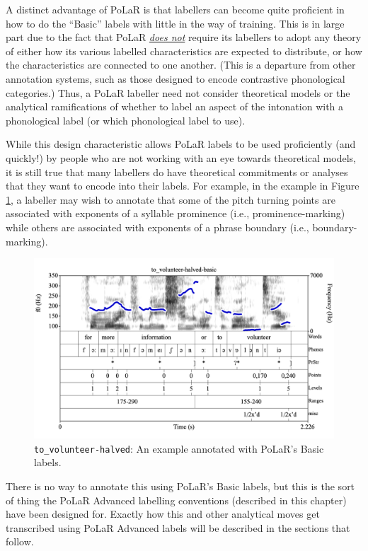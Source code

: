 \documentclass[11pt, twoside]{memoir}
\begin{document}
A distinct advantage of PoLaR is that labellers can become quite proficient in how to do the “Basic” labels with little in the way of training. This is in large part due to the fact that PoLaR \textit{\uline{does not}} require its labellers to adopt any theory of either how its various labelled characteristics are expected to distribute, or how the characteristics are connected to one another. (This is a departure from other annotation systems, such as those designed to encode contrastive phonological categories.) Thus, a PoLaR labeller need not consider theoretical models or the analytical ramifications of whether to label an aspect of the intonation with a phonological label (or which phonological label to use).

While this design characteristic allows PoLaR labels to be used proficiently (and quickly!) by people who are not working with an eye towards theoretical models, it is still true that many labellers do have theoretical commitments or analyses that they want to encode into their labels. For example, in the example in Figure \ref{fig:to volunteer-halved all basics}, a labeller may wish to annotate that some of the pitch turning points are associated with exponents of a syllable prominence (i.e., prominence-marking) while others are associated with exponents of a phrase boundary (i.e., boundary-marking).

\begin{figure}[H]
\centering
%
\includegraphics[width=.875\linewidth]{Appendix-to_volunteer-halved.png}
%
\caption{\texttt{to\_volunteer-halved}: An example annotated with PoLaR’s Basic labels.%
\label{fig:to volunteer-halved all basics}%
}
\end{figure}

There is no way to annotate this using PoLaR’s Basic labels, but this is the sort of thing the PoLaR Advanced labelling conventions (described in this chapter) have been designed for. Exactly how this and other analytical moves get transcribed using PoLaR Advanced labels will be described in the sections that follow.
\end{document}
